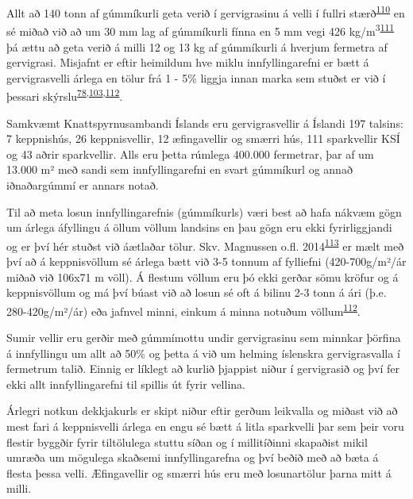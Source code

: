 \documentclass[icelandic,]{book}
\begin{document}
Allt að 140 tonn af gúmmíkurli geta verið í gervigrasinu á velli í fullri stærð\textsuperscript{\protect\hyperlink{ref-Wredh2014}{110}} en sé miðað við að um 30 mm lag af gúmmíkurli fínna en 5 mm vegi 426 kg/m\textsuperscript{3}\textsuperscript{\protect\hyperlink{ref-Gamalath2016}{111}} þá ættu að geta verið á milli 12 og 13 kg af gúmmíkurli á hverjum fermetra af gervigrasi. Misjafnt er eftir heimildum hve miklu innfyllingarefni er bætt á gervigrasvelli árlega en tölur frá 1 - 5\% liggja innan marka sem stuðst er við í þessari skýrslu\textsuperscript{\protect\hyperlink{ref-lassen2015microplastics}{78},\protect\hyperlink{ref-Hann2018}{103},\protect\hyperlink{ref-magnusson2016swedish}{112}}.

Samkvæmt Knattspyrnusambandi Íslands eru gervigrasvellir á Íslandi 197 talsins: 7 keppnishús, 26 keppnisvellir, 12 æfingavellir og smærri hús, 111 sparkvellir KSÍ og 43 aðrir sparkvellir. Alls eru þetta rúmlega 400.000 fermetrar, þar af um 13.000 m² með sandi sem innfyllingarefni en svart gúmmíkurl og annað iðnaðargúmmí er annars notað.

Til að meta losun innfyllingarefnis (gúmmíkurls) væri best að hafa nákvæm gögn um árlega áfyllingu á öllum völlum landsins en þau gögn eru ekki fyrirliggjandi og er því hér stuðst við áætlaðar tölur. Skv. Magnussen o.fl. 2014\textsuperscript{\protect\hyperlink{ref-magnusson2014mikroskrap}{113}} er mælt með því að á keppnisvöllum sé árlega bætt við 3-5 tonnum af fylliefni (420-700g/m²/ár miðað við 106x71 m völl). Á flestum völlum eru þó ekki gerðar sömu kröfur og á keppnisvöllum og má því búast við að losun sé oft á bilinu 2-3 tonn á ári (þ.e. 280-420g/m²/ár) eða jafnvel minni, einkum á minna notuðum völlum\textsuperscript{\protect\hyperlink{ref-magnusson2016swedish}{112}}.

Sumir vellir eru gerðir með gúmmímottu undir gervigrasinu sem minnkar þörfina á innfyllingu um allt að 50\% og þetta á við um helming íslenskra gervigrasvalla í fermetrum talið. Einnig er líklegt að kurlið þjappist niður í gervigrasið og því fer ekki allt innfyllingarefni til spillis út fyrir vellina.

Árlegri notkun dekkjakurls er skipt niður eftir gerðum leikvalla og miðast við að mest fari á keppnisvelli árlega en engu sé bætt á litla sparkvelli þar sem þeir voru flestir byggðir fyrir tiltölulega stuttu síðan og í millitíðinni skapaðist mikil umræða um mögulega skaðsemi innfyllingarefna og því beðið með að bæta á flesta þessa velli. Æfingavellir og smærri hús eru með losunartölur þarna mitt á milli.
\end{document}
